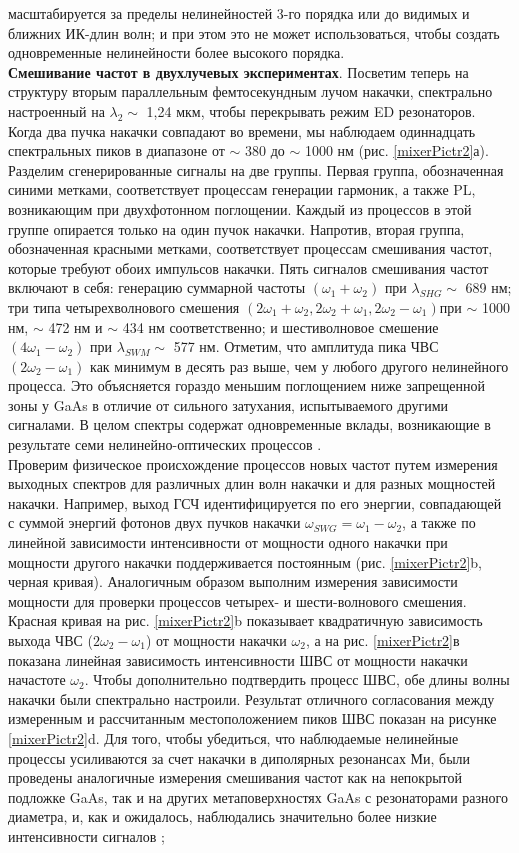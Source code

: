 масштабируется за пределы нелинейностей 3-го порядка или до видимых и ближних ИК-длин волн; и при этом это не может использоваться, чтобы создать одновременные нелинейности более высокого порядка.
\\
\hspace*{2mm}
\textbf{Смешивание частот в двухлучевых экспериментах}. Посветим теперь на структуру вторым параллельным фемтосекундным лучом накачки, спектрально настроенный на $\lambda_2 \sim$ 1,24 мкм, чтобы перекрывать режим ED резонаторов. Когда два пучка накачки совпадают во времени, мы наблюдаем одиннадцать спектральных пиков в диапазоне от $\sim$ 380 до  $\sim$ 1000 нм (рис. \ref{mixerPictr2}а). Разделим сгенерированные сигналы на две группы. Первая группа, обозначенная синими метками, соответствует процессам генерации гармоник, а также PL, возникающим при двухфотонном поглощении. Каждый из процессов в этой группе опирается только на один пучок накачки. Напротив, вторая группа, обозначенная красными метками, соответствует процессам смешивания частот, которые требуют обоих импульсов накачки. Пять сигналов смешивания частот включают в себя: генерацию суммарной частоты $(\omega_1 + \omega_2)$ при $\lambda_{SHG} \sim$ 689 нм; три типа четырехволнового смешения $(2\omega_1 + \omega_2, 2\omega_2 + \omega_1, 2\omega_2 - \omega_1)$при $\sim$ 1000 нм, $\sim$ 472 нм и $\sim$ 434 нм соответственно; и шестиволновое смешение $(4\omega_1 - \omega_2)$ при $\lambda_{SWM} \sim$ 577 нм. Отметим, что амплитуда пика ЧВС $(2\omega_2 - \omega_1)$ как минимум в десять раз выше, чем у любого другого нелинейного процесса. Это объясняется гораздо меньшим поглощением ниже запрещенной зоны у  GaAs в отличие от сильного затухания, испытываемого другими сигналами. В целом спектры содержат одновременные вклады, возникающие в результате семи нелинейно-оптических процессов .
\\
Проверим  физическое происхождение процессов новых частот путем измерения выходных спектров для различных длин волн накачки и для разных мощностей накачки. Например, выход ГСЧ идентифицируется по его энергии, совпадающей с суммой энергий фотонов двух пучков накачки $\omega_{SWG} = \omega_1 - \omega_2$, а также по линейной зависимости интенсивности от мощности одного накачки при мощности другого накачки поддерживается постоянным (рис. \ref{mixerPictr2}b, черная кривая). Аналогичным образом выполним измерения зависимости мощности для проверки процессов четырех- и шести-волнового смешения. Красная кривая на рис. \ref{mixerPictr2}b показывает квадратичную зависимость выхода ЧВС ($2\omega_2 - \omega_1$) от мощности накачки $\omega_2$, а на рис. \ref{mixerPictr2}в показана линейная зависимость интенсивности ШВС от мощности накачки начастоте $\omega_2$. Чтобы дополнительно подтвердить процесс ШВС, обе длины волны накачки были спектрально настроили. Результат отличного согласования между измеренным и рассчитанным местоположением пиков ШВС показан на рисунке \ref{mixerPictr2}d. Для того, чтобы убедиться, что наблюдаемые нелинейные процессы усиливаются за счет накачки в диполярных резонансах Ми, были проведены аналогичные измерения смешивания частот как на непокрытой подложке GaAs, так и на других метаповерхностях GaAs с резонаторами разного диаметра, и, как и ожидалось, наблюдались значительно более низкие интенсивности сигналов \cite{liu2018all};  

